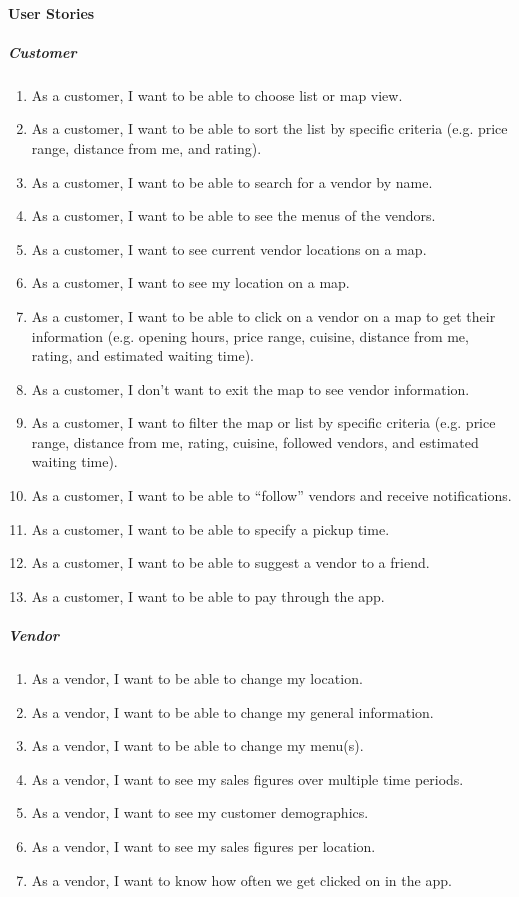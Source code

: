 \paragraph{User Stories}
\subparagraph{Customer}
\begin{enumerate}
  \item As a customer, I want to be able to choose list or map view.
  \item As a customer, I want to be able to sort the list by specific criteria (e.g. price range, distance from me, and rating).
  \item As a customer, I want to be able to search for a vendor by name.
  \item As a customer, I want to be able to see the menus of the vendors.
  \item As a customer, I want to see current vendor locations on a map.
  \item As a customer, I want to see my location on a map.
  \item As a customer, I want to be able to click on a vendor on a map to get their information (e.g. opening hours, price range, cuisine, distance from me, rating, and estimated waiting time).
  \item As a customer, I don’t want to exit the map to see vendor information.
  \item As a customer, I want to filter the map or list by specific criteria (e.g. price range, distance from me, rating, cuisine, followed vendors, and estimated waiting time).
  \item As a customer, I want to be able to “follow” vendors and receive notifications.
  \item As a customer, I want to be able to specify a pickup time.
  \item As a customer, I want to be able to suggest a vendor to a friend.
  \item As a customer, I want to be able to pay through the app.
\end{enumerate}

\subparagraph{Vendor}
\begin{enumerate}
  \item As a vendor, I want to be able to change my location.
  \item As a vendor, I want to be able to change my general information.
  \item As a vendor, I want to be able to change my menu(s).
  \item As a vendor, I want to see my sales figures over multiple time periods.
  \item As a vendor, I want to see my customer demographics.
  \item As a vendor, I want to see my sales figures per location.
  \item As a vendor, I want to know how often we get clicked on in the app.
\end{enumerate}

